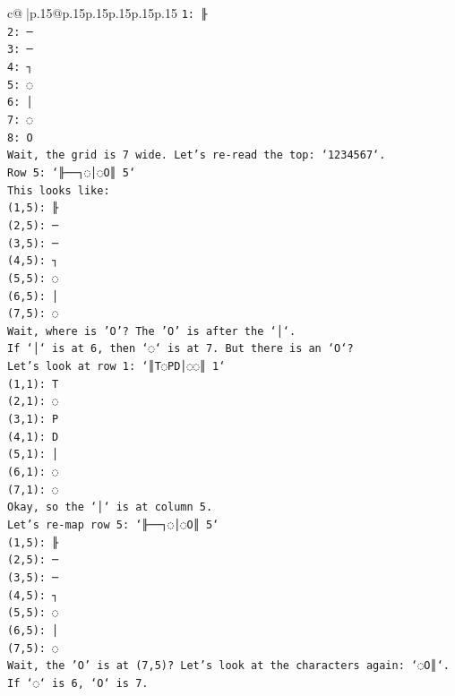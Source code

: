 \documentclass{article}
\begin{document}
{\begin{supertabular}{c@{$\;$}|p{.15\linewidth}@{}p{.15\linewidth}p{.15\linewidth}p{.15\linewidth}p{.15\linewidth}p{.15\linewidth}}
{{{\texttt{1: ╟} \\
\texttt{2: ─} \\
\texttt{3: ─} \\
\texttt{4: ┐} \\
\texttt{5: ◌} \\
\texttt{6: │} \\
\texttt{7: ◌} \\
\texttt{8: O} \\
\texttt{Wait, the grid is 7 wide. Let's re{-}read the top: `1234567`.} \\
\texttt{Row 5: `╟──┐◌│◌O║ 5`} \\
\texttt{This looks like:} \\
\texttt{(1,5): ╟} \\
\texttt{(2,5): ─} \\
\texttt{(3,5): ─} \\
\texttt{(4,5): ┐} \\
\texttt{(5,5): ◌} \\
\texttt{(6,5): │} \\
\texttt{(7,5): ◌} \\
\texttt{Wait, where is 'O'? The 'O' is after the `│`.} \\
\texttt{If `│` is at 6, then `◌` is at 7. But there is an `O`?} \\
\texttt{Let's look at row 1: `║T◌PD│◌◌║ 1`} \\
\texttt{(1,1): T} \\
\texttt{(2,1): ◌} \\
\texttt{(3,1): P} \\
\texttt{(4,1): D} \\
\texttt{(5,1): │} \\
\texttt{(6,1): ◌} \\
\texttt{(7,1): ◌} \\
\texttt{Okay, so the `│` is at column 5.} \\
\texttt{Let's re{-}map row 5: `╟──┐◌│◌O║ 5`} \\
\texttt{(1,5): ╟} \\
\texttt{(2,5): ─} \\
\texttt{(3,5): ─} \\
\texttt{(4,5): ┐} \\
\texttt{(5,5): ◌} \\
\texttt{(6,5): │} \\
\texttt{(7,5): ◌} \\
\texttt{Wait, the 'O' is at (7,5)? Let's look at the characters again: `◌O║`.} \\
\texttt{If `◌` is 6, `O` is 7.} \\
}}}
\end{supertabular}}
\end{document}
